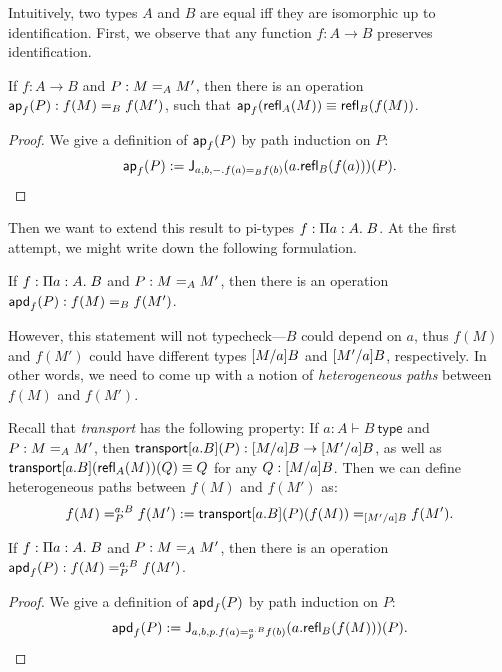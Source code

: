 \documentclass{article}
\begin{document}
Intuitively, two types $A$ and $B$ are equal iff they are isomorphic up to 
identification.
First, we observe that any function $f : A \to B$ preserves identification.

\begin{lemma}
	If $f : A \to B$ and $P : \Ideq{A}{M}{M'}$, then there is an operation 
	$\hap{f}{P} : \Ideq{B}{f(M)}{f(M')}$, such that $\hap{f}{\refl{A}{M}} 
	\equiv \refl{B}{f(M)}$.
\end{lemma}
\begin{proof}
	We give a definition of $\hap{f}{P}$ by path induction on $P$:
	\[
	\hap{f}{P} \eqdef  \Idelim{a,b,-. \Ideq{B}{f(a)}{f(b)}}{a.\refl{B}{f(a)}}{P}.
	\]
\end{proof}

Then we want to extend this result to pi-types $f : 
\hpitype{a}{A}{B}$.
At the first attempt, we might write down the following formulation.

\begin{claim}
	If $f : \hpitype{a}{A}{B}$ and $P : \Ideq{A}{M}{M'}$, then there is an 
	operation $\hapd{f}{P} : \Ideq{B}{f(M)}{f(M')}$.
\end{claim}

However, this statement will not typecheck---$B$ could depend on $a$, thus 
$f(M)$ and 
$f(M')$ could have different types $\subst{M}{a}{B}$ and 
$\subst{M'}{a}{B}$, 
respectively.
In other words, we need to come up with a notion of \emph{heterogeneous 
paths} between $f(M)$ and $f(M')$.


Recall that \emph{transport} has the following property:
If $a : A \vdash B~\mathsf{type}$ and $P : \Ideq{A}{M}{M'}$, then 
$\transport{a.B}(P) : \subst{M}{a}{B} \to \subst{M'}{a}{B}$, as well as 
$\transport{a.B}(\refl{A}{M})(Q) \equiv Q$ for any $Q : \subst{M}{a}{B}$.
Then we can define heterogeneous paths between $f(M)$ and $f(M')$ as:
\[
\DIdeq{a.B}{P}{f(M)}{f(M')} \eqdef  \Ideq{ \subst{M'}{a}{B}  
}{\transport{a.B}(P)(f(M))}{f(M')}.
\]

\begin{lemma}
	If $f : \hpitype{a}{A}{B}$ and $P: \Ideq{A}{M}{M'}$, then there is an 
	operation $\hapd{f}{P} : \DIdeq{a.B}{P}{f(M)}{f(M')}$.
\end{lemma}
\begin{proof}
	We give a definition of $\hapd{f}{P}$ by path induction on $P$:
	\[
	\hapd{f}{P} \eqdef \Idelim{a,b,p. 
	 \DIdeq{a.B}{p}{f(a)}{f(b)} }{a. \refl{B}{f(M)} 
	}{P}.
	\]
\end{proof}
\end{document}
